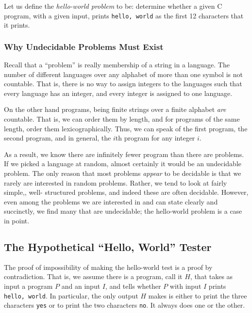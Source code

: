 \documentclass[]{article}
\begin{document}
    Let us define the \emph{hello-world problem} to be: determine whether a 
    given C program, with a given input, prints \texttt{hello, world} as the 
    first 12 characters that it prints.
    
      \subsubsection*{Why Undecidable Problems Must Exist}
        Recall that a ``problem'' is really membership of a string in a 
        language. The number of different languages over any alphabet of more 
        than one symbol is not countable. That is, there is no way to assign 
        integers to the languages such that every language has an integer, and 
        every integer is assigned to one language.
        
        On the other hand programs, being finite strings over a finite alphabet
        \emph{are} countable. That is, we can order them by length, and for
        programs of the same length, order them lexicographically. Thus, we can
        speak of the first program, the second program, and in general, the 
        $i$th program for any integer $i$.
        
        As a result, we know there are infinitely fewer program than there are
        problems. If we picked a language at random, almost certainly it would 
        be an undecidable problem. The only reason that most problems 
        \emph{appear} to be decidable is that we rarely are interested in 
        random problems. Rather, we tend to look at fairly simple,, well-
        structured problems, and indeed these are often decidable. However, 
        even among the problems we are interested in and can state clearly and 
        succinctly, we find many that are undecidable; the hello-world problem 
        is a case in point.
        
  \subsection*{The Hypothetical ``Hello, World'' Tester}
    The proof of impossibility of making the hello-world test is a proof by
    contradiction. That is, we assume there is a program, call it $H$, that 
    takes as input a program $P$ and an input $I$, and tells whether $P$ with 
    input $I$ prints \texttt{hello, world}. In particular, the only output $H$ 
    makes is either to print the three characters \texttt{yes} or to print the 
    two characters \texttt{no}. It always does one or the other.
    
\end{document}
